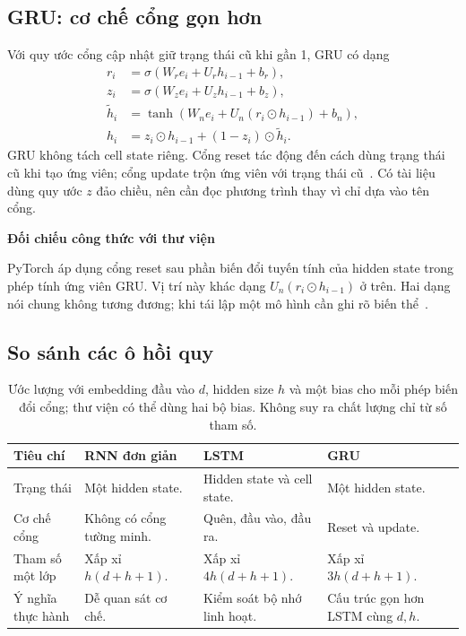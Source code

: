 \documentclass[11pt,a4paper]{article}
\numberwithin{equation}{section}
\newcommand{\notebox}[2]{\par\smallskip\noindent
  \begingroup\setlength{\fboxsep}{10pt}\colorbox{PaleBlue}{%
  \parbox{\dimexpr\linewidth-20pt\relax}{\textbf{\color{ReportBlue}#1}\par\smallskip #2}}%
  \endgroup\par\smallskip}
\begin{document}
\subsection{GRU: cơ chế cổng gọn hơn}
Với quy ước cổng cập nhật giữ trạng thái cũ khi gần 1, GRU có dạng
\begin{align}
r_i&=\sigma(W_re_i+U_rh_{i-1}+b_r),\\
z_i&=\sigma(W_ze_i+U_zh_{i-1}+b_z),\\
\tilde h_i&=\tanh(W_ne_i+U_n(r_i\odot h_{i-1})+b_n),\\
h_i&=z_i\odot h_{i-1}+(1-z_i)\odot\tilde h_i.
\end{align}
GRU không tách cell state riêng. Cổng reset tác động đến cách dùng trạng thái cũ khi tạo ứng viên; cổng update trộn ứng viên với trạng thái cũ~\cite{cho,d2lgru}. Có tài liệu dùng quy ước $z$ đảo chiều, nên cần đọc phương trình thay vì chỉ dựa vào tên cổng.

\notebox{Đối chiếu công thức với thư viện}{PyTorch áp dụng cổng reset sau phần biến đổi tuyến tính của hidden state trong phép tính ứng viên GRU. Vị trí này khác dạng $U_n(r_i\odot h_{i-1})$ ở trên. Hai dạng nói chung không tương đương; khi tái lập một mô hình cần ghi rõ biến thể~\cite{torchgru}.}

\subsection{So sánh các ô hồi quy}
\begin{table}[H]
\centering\small
\begin{tabularx}{\linewidth}{@{}p{2cm}YYY@{}}
\toprule{}Tiêu chí & RNN đơn giản & LSTM & GRU\\\midrule
Trạng thái & Một hidden state. & Hidden state và cell state. & Một hidden state.\\
Cơ chế cổng & Không có cổng tường minh. & Quên, đầu vào, đầu ra. & Reset và update.\\
Tham số một lớp & Xấp xỉ $h(d+h+1)$. & Xấp xỉ $4h(d+h+1)$. & Xấp xỉ $3h(d+h+1)$.\\
Ý nghĩa thực hành & Dễ quan sát cơ chế. & Kiểm soát bộ nhớ linh hoạt. & Cấu trúc gọn hơn LSTM cùng $d,h$.\\
\bottomrule
\end{tabularx}
\caption{Ước lượng với embedding đầu vào $d$, hidden size $h$ và một bias cho mỗi phép biến đổi cổng; thư viện có thể dùng hai bộ bias. Không suy ra chất lượng chỉ từ số tham số.}
\end{table}
\end{document}
